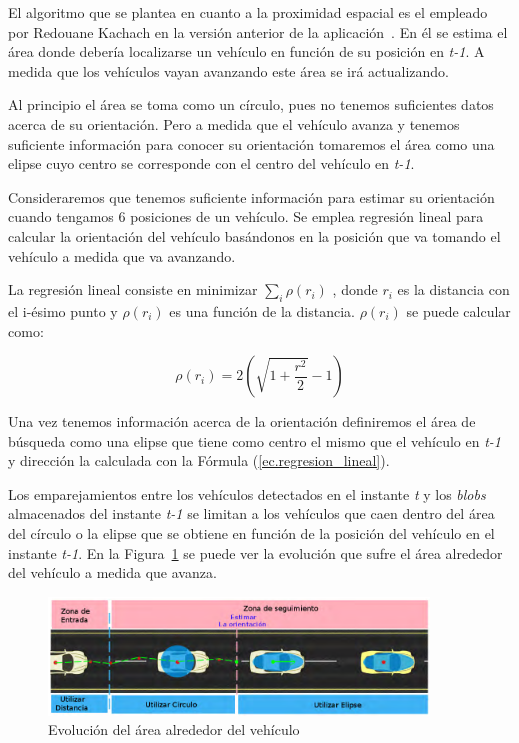 El algoritmo que se plantea en cuanto a la proximidad espacial es el empleado por Redouane Kachach en la versión anterior de la aplicación~\cite{redo_tesis}. En él se estima el área donde debería localizarse un vehículo en función de su posición en \textit{t-1}. A medida que los vehículos vayan avanzando este área se irá actualizando.

Al principio el área se toma como un círculo, pues no tenemos suficientes datos acerca de su orientación. Pero a medida que el vehículo avanza y tenemos suficiente información para conocer su orientación tomaremos el área como una elipse cuyo centro se corresponde con el centro del vehículo en \textit{t-1}. 

Consideraremos que tenemos suficiente información para estimar su orientación cuando tengamos 6 posiciones de un vehículo. Se emplea regresión lineal para calcular la orientación del vehículo basándonos en la posición que va tomando el vehículo a medida que va avanzando. 

La regresión lineal consiste en minimizar $\sum_{i}\rho(r_i)$ , donde $r_i$  es la  distancia  con  el  i-ésimo  punto  y $\rho(r_i)$ es una función de la distancia. $\rho(r_i)$ se puede calcular como:

\begin{equation}\label{ec.regresion_lineal}
   \rho(r_i) = 2(\sqrt{1 +\frac{r^2}{2}} - 1) 
\end{equation}

Una vez tenemos información acerca de la orientación definiremos el área de búsqueda como una elipse que tiene como centro el mismo que el vehículo en \textit{t-1} y dirección la calculada con la Fórmula (\ref{ec.regresion_lineal}).

Los emparejamientos entre los vehículos detectados en el instante \textit{t} y los \textit{blobs} almacenados del instante \textit{t-1} se limitan a los vehículos que caen dentro del área del círculo o la elipse que se obtiene en función de la posición del vehículo en el instante \textit{t-1}. En la Figura~\ref{fig.area_vehiculo} se puede ver la evolución que sufre el área alrededor del vehículo a medida que avanza.

 \begin{figure}[H] 
\begin{center}
	\includegraphics[width=0.9\textwidth]{figures/Diseno_global/areas_vehiculo.png}
   \caption{Evolución del área alrededor del vehículo}
	\label{fig.area_vehiculo}
\end{center}
\end{figure}


